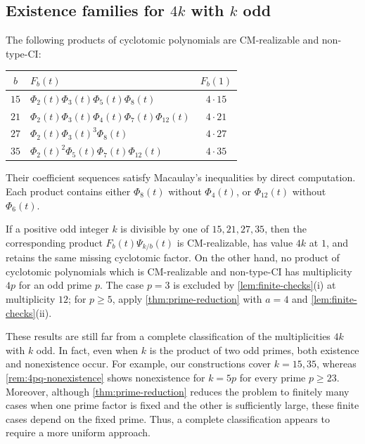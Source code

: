 \documentclass[11pt,a4paper]{amsart}
\theoremstyle{definition}
\theoremstyle{remark}
\begin{document}
\subsection{Existence families for \texorpdfstring{$4k$}{4k} with \texorpdfstring{$k$}{k} odd}
The following products of cyclotomic polynomials are CM-realizable and non-type-CI:
\begin{center}
\begin{tabular}{@{}clc@{}}
\toprule
$b$ & $F_b(t)$ & $F_b(1)$\\
\midrule
$15$ & $\Phi_2(t)\Phi_3(t)\Phi_5(t)\Phi_8(t)$ & $4\cdot15$\\
$21$ & $\Phi_2(t)\Phi_3(t)\Phi_4(t)\Phi_7(t)\Phi_{12}(t)$ & $4\cdot21$\\
$27$ & $\Phi_2(t)\Phi_3(t)^3\Phi_8(t)$ & $4\cdot27$\\
$35$ & $\Phi_2(t)^2\Phi_5(t)\Phi_7(t)\Phi_{12}(t)$ & $4\cdot35$\\
\bottomrule
\end{tabular}
\end{center}
Their coefficient sequences satisfy Macaulay's inequalities by direct computation. Each product contains either $\Phi_8(t)$ without $\Phi_4(t)$, or $\Phi_{12}(t)$ without $\Phi_6(t)$.

If a positive odd integer $k$ is divisible by one of $15,21,27,35$, then the corresponding product $F_b(t)\Psi_{k/b}(t)$ is CM-realizable, has value $4k$ at $1$, and retains the same missing cyclotomic factor. On the other hand, no product of cyclotomic polynomials which is CM-realizable and non-type-CI has multiplicity $4p$ for an odd prime $p$. The case $p=3$ is excluded by \cref{lem:finite-checks}\textup{(i)} at multiplicity $12$; for $p\ge5$, apply \cref{thm:prime-reduction} with $a=4$ and \cref{lem:finite-checks}\textup{(ii)}.

These results are still far from a complete classification of the multiplicities $4k$ with $k$ odd. In fact, even when $k$ is the product of two odd primes, both existence and nonexistence occur. For example, our constructions cover $k=15,35$, whereas \cref{rem:4pq-nonexistence} shows nonexistence for $k=5p$ for every prime $p\ge23$. Moreover, although \cref{thm:prime-reduction} reduces the problem to finitely many cases when one prime factor is fixed and the other is sufficiently large, these finite cases depend on the fixed prime. Thus, a complete classification appears to require a more uniform approach.
\end{document}
